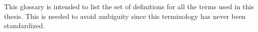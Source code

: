 This glossary is intended to list the set of definitions for all the terms used in this thesis.
This is needed to avoid ambiguity since this terminology has never been standardized.